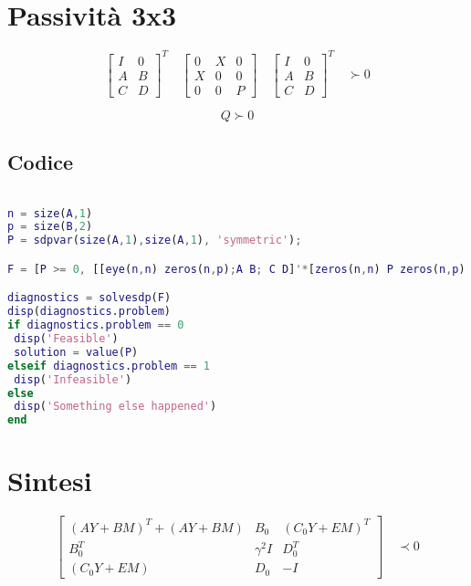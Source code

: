 \documentclass{article}
\begin{document}
\section{Passività 3x3}

\begin{equation}
%
\begin{bmatrix} I & 0 \\ A & B \\ C & D
\end{bmatrix}^{T}\quad \begin{bmatrix} 0 & X & 0 \\ X & 0 & 0 \\ 0 & 0 & P
\end{bmatrix}\quad \begin{bmatrix} I & 0 \\ A & B \\ C & D
\end{bmatrix}^{T}\quad \succ 0
%
\end{equation}

\begin{equation}
Q \succ 0
\end{equation}


\subsection{Codice}

\begin{lstlisting}[language=Matlab]  % Start your code-block

n = size(A,1)
p = size(B,2)
P = sdpvar(size(A,1),size(A,1), 'symmetric');

F = [P >= 0, [[eye(n,n) zeros(n,p);A B; C D]'*[zeros(n,n) P zeros(n,p); P zeros(n,n) zeros(n,p); zeros(p,n) zeros(p,n) eye(p,p)]*[eye(n,n) zeros(n,p);A B; C D]] >= 0];

diagnostics = solvesdp(F)
disp(diagnostics.problem)
if diagnostics.problem == 0
 disp('Feasible')
 solution = value(P)
elseif diagnostics.problem == 1
 disp('Infeasible')
else
 disp('Something else happened')
end

\end{lstlisting}


\section{Sintesi}

\begin{equation}
%
\begin{bmatrix} (AY + BM)^{T} + (AY + BM) & B_0 & (C_{0}Y + EM)^{T} \\ B_{0}^{T} & \gamma^{2}I & D_{0}^{T} \\ (C_{0}Y + EM) & D_{0} & -I  
\end{bmatrix}\quad \prec 0
%
\end{equation}
\end{document}

